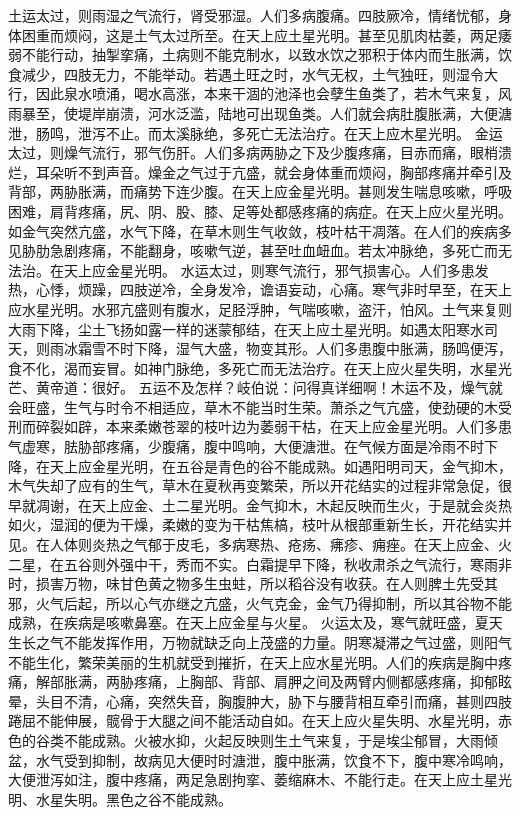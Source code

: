 \documentclass[a4paper,12pt,UTF8,twoside]{ctexbook}
\begin{document}
土运太过，则雨湿之气流行，肾受邪湿。人们多病腹痛。四肢厥冷，情绪忧郁，身体困重而烦闷，这是土气太过所至。在天上应土星光明。甚至见肌肉枯萎，两足痿弱不能行动，抽掣挛痛，土病则不能克制水，以致水饮之邪积于体内而生胀满，饮食减少，四肢无力，不能举动。若遇土旺之时，水气无权，土气独旺，则湿令大行，因此泉水喷涌，喝水高涨，本来干涸的池泽也会孽生鱼类了，若木气来复，风雨暴至，使堤岸崩溃，河水泛滥，陆地可出现鱼类。人们就会病肚腹胀满，大便溏泄，肠鸣，泄泻不止。而太溪脉绝，多死亡无法治疗。在天上应木星光明。
金运太过，则燥气流行，邪气伤肝。人们多病两胁之下及少腹疼痛，目赤而痛，眼梢溃烂，耳朵听不到声音。燥金之气过于亢盛，就会身体重而烦闷，胸部疼痛并牵引及背部，两胁胀满，而痛势下连少腹。在天上应金星光明。甚则发生喘息咳嗽，呼吸困难，肩背疼痛，尻、阴、股、膝、足等处都感疼痛的病症。在天上应火星光明。如金气突然亢盛，水气下降，在草木则生气收敛，枝叶枯干凋落。在人们的疾病多见胁肋急剧疼痛，不能翻身，咳嗽气逆，甚至吐血衄血。若太冲脉绝，多死亡而无法治。在天上应金星光明。
水运太过，则寒气流行，邪气损害心。人们多患发热，心悸，烦躁，四肢逆冷，全身发冷，谵语妄动，心痛。寒气非时早至，在天上应水星光明。水邪亢盛则有腹水，足胫浮肿，气喘咳嗽，盗汗，怕风。土气来复则大雨下降，尘土飞扬如露一样的迷蒙郁结，在天上应土星光明。如遇太阳寒水司天，则雨冰霜雪不时下降，湿气大盛，物变其形。人们多患腹中胀满，肠鸣便泻，食不化，渴而妄冒。如神门脉绝，多死亡而无法治疗。在天上应火星失明，水星光芒、黄帝道：很好。
五运不及怎样？岐伯说：问得真详细啊！木运不及，燥气就会旺盛，生气与时令不相适应，草木不能当时生荣。萧杀之气亢盛，使劲硬的木受刑而碎裂如辟，本来柔嫩苍翠的枝叶边为萎弱干枯，在天上应金星光明。人们多患气虚寒，胠胁部疼痛，少腹痛，腹中鸣响，大便溏泄。在气候方面是冷雨不时下降，在天上应金星光明，在五谷是青色的谷不能成熟。如遇阳明司天，金气抑木，木气失却了应有的生气，草木在夏秋再变繁荣，所以开花结实的过程非常急促，很早就凋谢，在天上应金、土二星光明。金气抑木，木起反映而生火，于是就会炎热如火，湿润的便为干燥，柔嫩的变为干枯焦槁，枝叶从根部重新生长，开花结实并见。在人体则炎热之气郁于皮毛，多病寒热、疮疡、疿疹、痈痤。在天上应金、火二星，在五谷则外强中干，秀而不实。白霜提早下降，秋收肃杀之气流行，寒雨非时，损害万物，味甘色黄之物多生虫蛀，所以稻谷没有收获。在人则脾土先受其邪，火气后起，所以心气亦继之亢盛，火气克金，金气乃得抑制，所以其谷物不能成熟，在疾病是咳嗽鼻塞。在天上应金星与火星。
火运太及，寒气就旺盛，夏天生长之气不能发挥作用，万物就缺乏向上茂盛的力量。阴寒凝滞之气过盛，则阳气不能生化，繁荣美丽的生机就受到摧折，在天上应水星光明。人们的疾病是胸中疼痛，解部胀满，两胁疼痛，上胸部、背部、肩胛之间及两臂内侧都感疼痛，抑郁眩晕，头目不清，心痛，突然失音，胸腹肿大，胁下与腰背相互牵引而痛，甚则四肢踡屈不能伸展，髋骨于大腿之间不能活动自如。在天上应火星失明、水星光明，赤色的谷类不能成熟。火被水抑，火起反映则生土气来复，于是埃尘郁冒，大雨倾盆，水气受到抑制，故病见大便时时溏泄，腹中胀满，饮食不下，腹中寒冷鸣响，大便泄泻如注，腹中疼痛，两足急剧拘挛、萎缩麻木、不能行走。在天上应土星光明、水星失明。黑色之谷不能成熟。
\end{document}

